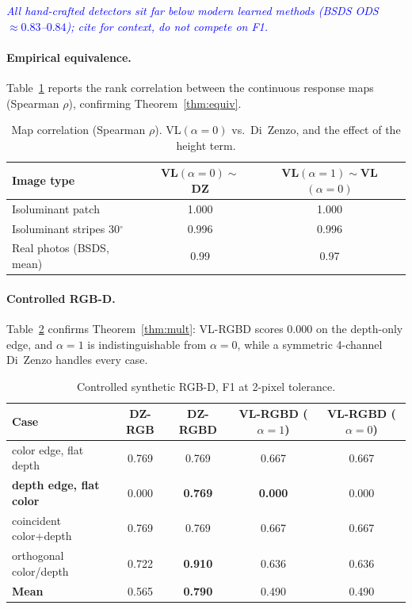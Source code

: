 \documentclass[11pt,a4paper]{article}
\newcommand{\note}[1]{\textcolor{blue}{\textit{#1}}}
\theoremstyle{plain}
\theoremstyle{definition}
\begin{document}
\note{All hand-crafted detectors sit far below modern learned methods
(BSDS ODS $\approx 0.83$--$0.84$); cite for context, do not compete on F1.}

\paragraph{Empirical equivalence.}
Table~\ref{tab:corr} reports the rank correlation between the continuous
response maps (Spearman $\rho$), confirming Theorem~\ref{thm:equiv}.

\begin{table}[h]
\centering
\caption{Map correlation (Spearman $\rho$). VL$(\alpha{=}0)$ vs.\ Di~Zenzo, and
the effect of the height term.}
\label{tab:corr}
\begin{tabular}{lcc}
\toprule
Image type & VL$(\alpha{=}0)\!\sim\!$DZ & VL$(\alpha{=}1)\!\sim\!$VL$(\alpha{=}0)$ \\
\midrule
Isoluminant patch        & 1.000 & 1.000 \\
Isoluminant stripes 30$^\circ$ & 0.996 & 0.996 \\
Real photos (BSDS, mean) & 0.99  & 0.97 \\
\bottomrule
\end{tabular}
\end{table}

\paragraph{Controlled RGB-D.}
Table~\ref{tab:rgbd} confirms Theorem~\ref{thm:mult}: VL-RGBD scores $0.000$ on
the depth-only edge, and $\alpha{=}1$ is indistinguishable from $\alpha{=}0$,
while a symmetric 4-channel Di~Zenzo handles every case.

\begin{table}[h]
\centering
\caption{Controlled synthetic RGB-D, F1 at 2-pixel tolerance.}
\label{tab:rgbd}
\begin{tabular}{lcccc}
\toprule
Case & DZ-RGB & DZ-RGBD & VL-RGBD ($\alpha{=}1$) & VL-RGBD ($\alpha{=}0$) \\
\midrule
color edge, flat depth      & 0.769 & 0.769 & 0.667 & 0.667 \\
\textbf{depth edge, flat color} & 0.000 & \textbf{0.769} & \textbf{0.000} & 0.000 \\
coincident color+depth      & 0.769 & 0.769 & 0.667 & 0.667 \\
orthogonal color/depth      & 0.722 & \textbf{0.910} & 0.636 & 0.636 \\
\midrule
\textbf{Mean}               & 0.565 & \textbf{0.790} & 0.490 & 0.490 \\
\bottomrule
\end{tabular}
\end{table}
\end{document}
